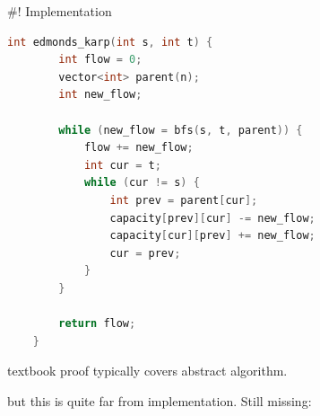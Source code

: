 \documentclass[fleqn]{beamer}
\begin{document}
  \vfill

  \hfill
  \hfill
  \hfill
  \hfill
  \hfill
  \hfill{}


#! Implementation
  \begin{minipage}{.49\textwidth}
  \footnotesize
  \algoEdka
  \end{minipage}%
  \begin{minipage}{.49\textwidth}
  \tiny
  \begin{lstlisting}[language=C++]
    int edmonds_karp(int s, int t) {
        int flow = 0;
        vector<int> parent(n);
        int new_flow;

        while (new_flow = bfs(s, t, parent)) {
            flow += new_flow;
            int cur = t;
            while (cur != s) {
                int prev = parent[cur];
                capacity[prev][cur] -= new_flow;
                capacity[cur][prev] += new_flow;
                cur = prev;
            }
        }

        return flow;
    }
    \end{lstlisting}
  \end{minipage}



  \onslide<+->
  textbook proof typically covers abstract algorithm.

  \onslide<+->
  but this is quite far from implementation. Still missing:
\end{document}
